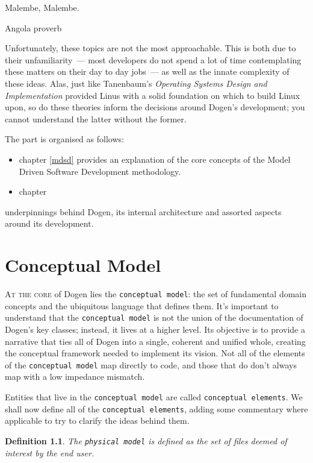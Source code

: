 \documentclass{book}
\newtheorem{concept}{Definition}
\begin{document}
\epigraph{Malembe, Malembe.}{Angola proverb}

Unfortunately, these topics are not the most approachable. This is
both due to their unfamiliarity~--- most developers do not spend a lot
of time contemplating these matters on their day to day jobs~--- as
well as the innate complexity of these ideas. Alas, just like
Tanenbaum's \emph{Operating Systems Design and Implementation}
provided Linus with a solid foundation on which to build Linux upon,
so do these theories inform the decisions around Dogen's development;
you cannot understand the latter without the former.

The part is organised as follows:

\begin{itemize}
  \item chapter \ref{mdsd} provides an explanation of the core
    concepts of the Model Driven Software Development methodology.
  \item chapter
\end{itemize}

underpinnings behind Dogen, its internal architecture and assorted
aspects around its development.

\chapter{Conceptual Model}

\lettrine{A}{t the core} of Dogen lies the \texttt{conceptual model}:
the set of fundamental domain concepts and the ubiquitous language
that defines them. It's important to understand that the
\texttt{conceptual model} is not the union of the documentation of
Dogen's key classes; instead, it lives at a higher level. Its
objective is to provide a narrative that ties all of Dogen into a
single, coherent and unified whole, creating the conceptual framework
needed to implement its vision. Not all of the elements of the
\texttt{conceptual model} map directly to code, and those that do
don't always map with a low impedance mismatch.

Entities that live in the \texttt{conceptual model} are called
\texttt{conceptual elements}. We shall now define all of the
\texttt{conceptual elements}, adding some commentary where applicable
to try to clarify the ideas behind them.

\begin{concept}
  The \texttt{physical model} is defined as the set of files deemed of
  interest by the end user.
\end{concept}
\end{document}
